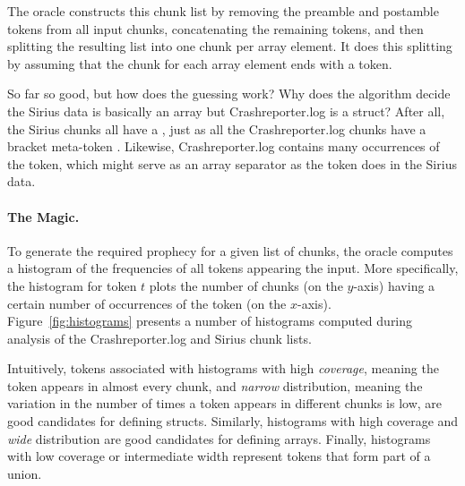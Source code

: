 \noindent
The oracle constructs this chunk list by removing the preamble and
postamble tokens from all input chunks, concatenating the
remaining tokens, and then splitting the resulting list into one chunk
per array element. It does this splitting by assuming that the chunk
for each array element ends with a  token.  

So far so good, but how does the guessing work?  Why does the
algorithm decide the Sirius data is basically an array but 
Crashreporter.log is a struct? After all, the Sirius chunks all have
a , just as all the Crashreporter.log chunks have a bracket
meta-token \cd{[*]}. Likewise, Crashreporter.log contains many occurrences of
the  token, which might serve as
an array separator as the  token does in the Sirius data.



\paragraph*{The Magic.}
To generate the required prophecy for a given list of chunks, the
oracle computes a histogram of the frequencies of all tokens appearing
the input.  
More specifically, the histogram for token $t$
plots the number of chunks (on the $y$-axis)
having a certain number of occurrences of the token (on the $x$-axis). 
Figure~\ref{fig:histograms} presents a number of histograms computed
during analysis of the Crashreporter.log and Sirius chunk lists.

Intuitively, tokens associated 
with histograms with high {\em coverage}, meaning the token appears
in almost every chunk, and {\em narrow} distribution, meaning the variation in
the number of times a token appears in different chunks is low, are
good candidates for defining structs.  Similarly, histograms with
high coverage and {\em wide} distribution are good candidates for defining
arrays.  Finally, histograms with low coverage or intermediate width
represent tokens that form part of a union.  


